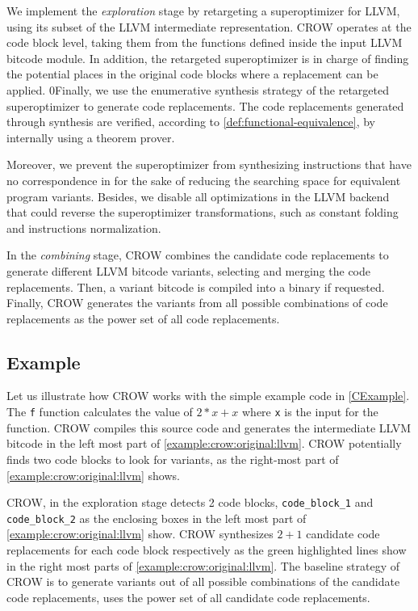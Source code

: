 We implement the \emph{exploration} stage by retargeting a superoptimizer for  LLVM, using its subset of the LLVM intermediate representation. CROW operates at the code block level, taking them from the functions defined inside the input LLVM bitcode module. In addition, the retargeted superoptimizer is in charge of finding the potential places in the original code blocks where a replacement can be applied. 0Finally, we use the enumerative synthesis strategy of the retargeted superoptimizer to generate code replacements.
The code replacements generated through synthesis are verified, according to \autoref{def:functional-equivalence}, by internally using a theorem prover. 

Moreover, we prevent the superoptimizer from synthesizing instructions that have no correspondence in \wasm for the sake of reducing the searching space for equivalent program variants. Besides, we disable all optimizations in the \wasm LLVM backend that could reverse the superoptimizer transformations, such as constant folding and instructions normalization.


In the \emph{combining} stage, CROW combines the candidate code replacements to generate different LLVM bitcode variants, selecting and merging the code replacements. 
Then, a variant bitcode is compiled into a \wasm binary if requested. Finally, CROW generates the variants from all possible combinations of code replacements as the power set of all code replacements.  

\subsection{Example}
\label{section:crow:example}
 Let us illustrate how CROW works with the simple example code in \autoref{CExample}. The \texttt{f} function calculates the value of $2 * x + x$ where \texttt{x} is the input for the function.  CROW compiles this source code and generates the intermediate LLVM bitcode in the left most part of \autoref{example:crow:original:llvm}. CROW potentially finds two code blocks to look for variants, as the right-most part of \autoref{example:crow:original:llvm} shows.


    

CROW, in the exploration stage detects 2 code blocks, \texttt{code\_block\_1} and \texttt{code\_block\_2} as the enclosing boxes in the left most part of \autoref{example:crow:original:llvm} show. CROW synthesizes $2 + 1$ candidate code replacements for each code block respectively as the green highlighted lines show in the right most parts of \autoref{example:crow:original:llvm}.
The baseline strategy of CROW is to generate variants out of all possible combinations of the candidate code replacements, \ie uses the power set of all candidate code replacements.

